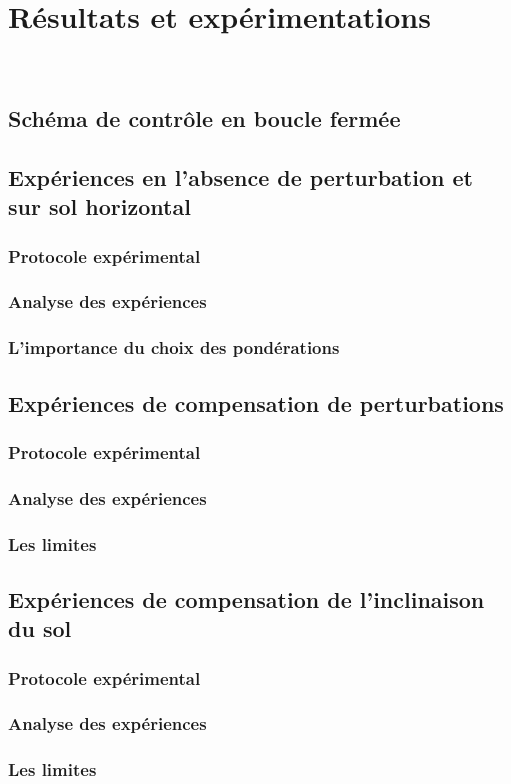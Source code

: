 \chapter{Résultats et expérimentations}

	~

	\section{Schéma de contrôle en boucle fermée}
	\section{Expériences en l'absence de perturbation et sur sol horizontal}
		\subsection{Protocole expérimental}
		\subsection{Analyse des expériences}
		\subsection{L'importance du choix des pondérations}
	\section{Expériences de compensation de perturbations}
		\subsection{Protocole expérimental}
		\subsection{Analyse des expériences}
		\subsection{Les limites}
	\section{Expériences de compensation de l'inclinaison du sol}
		\subsection{Protocole expérimental}
		\subsection{Analyse des expériences}
		\subsection{Les limites}